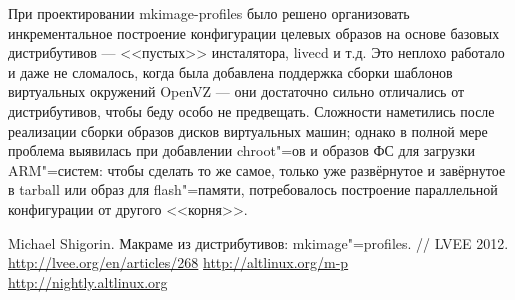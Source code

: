 \documentclass[10pt, a5paper]{article}
\begin{document}
При проектировании mkimage-profiles было решено организовать инкрементальное построение конфигурации целевых образов на основе базовых дистрибутивов --- <<пустых>> инсталятора, livecd и т.д. Это неплохо работало и даже не сломалось, когда была добавлена поддержка сборки шаблонов виртуальных окружений OpenVZ --- они достаточно сильно отличались от дистрибутивов, чтобы беду особо не предвещать. Сложности наметились после реализации сборки образов дисков виртуальных машин; однако в полной мере проблема выявилась при добавлении chroot"=ов и образов ФС для загрузки ARM"=систем: чтобы сделать то же самое, только уже развёрнутое и завёрнутое в tarball или образ для flash"=памяти, потребовалось построение параллельной конфигурации от другого <<корня>>.

\begin{thebibliography}{99}
 Michael Shigorin. Макраме из дистрибутивов: mkimage"=profiles. // LVEE 2012. \url{http://lvee.org/en/articles/268}
 \url{http://altlinux.org/m-p}
 \url{http://nightly.altlinux.org}
\end{thebibliography}
\end{document}
